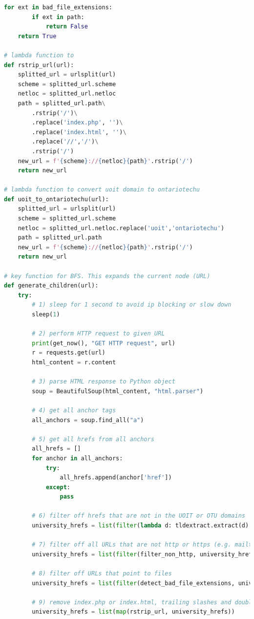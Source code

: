\begin{lstlisting}[language=Python]
    for ext in bad_file_extensions:
        if ext in path:
            return False
    return True

# lambda function to 
def rstrip_url(url):
    splitted_url = urlsplit(url)
    scheme = splitted_url.scheme
    netloc = splitted_url.netloc
    path = splitted_url.path\
        .rstrip('/')\
        .replace('index.php', '')\
        .replace('index.html', '')\
        .replace('//','/')\
        .rstrip('/')
    new_url = f'{scheme}://{netloc}{path}'.rstrip('/')
    return new_url

# lambda function to convert uoit domain to ontariotechu
def uoit_to_ontariotechu(url):
    splitted_url = urlsplit(url)
    scheme = splitted_url.scheme
    netloc = splitted_url.netloc.replace('uoit','ontariotechu')
    path = splitted_url.path
    new_url = f'{scheme}://{netloc}{path}'.rstrip('/')
    return new_url

# key function for BFS. This expands the current node (URL)
def generate_children(url):
    try:
        # 1) sleep for 1 second to avoid ip blocking or slow down
        sleep(1)
        
        # 2) perform HTTP request to given URL
        print(get_now(), "GET HTTP request", url)
        r = requests.get(url)
        html_content = r.content

        # 3) parse HTML response to Python object
        soup = BeautifulSoup(html_content, "html.parser")

        # 4) get all anchor tags
        all_anchors = soup.find_all("a")
        
        # 5) get all hrefs from all anchors
        all_hrefs = []
        for anchor in all_anchors:
            try:
                all_hrefs.append(anchor['href'])
            except:
                pass

        # 6) filter off hrefs that are not in the UOIT or OTU domains
        university_hrefs = list(filter(lambda d: tldextract.extract(d).domain in university_domains, all_hrefs))

        # 7) filter off all URLs that are not http or https (e.g. mailto)
        university_hrefs = list(filter(filter_non_http, university_hrefs))

        # 8) filter off URLs that point to files
        university_hrefs = list(filter(detect_bad_file_extensions, university_hrefs))

        # 9) remove index.php or index.html, trailing slashes and double slashes
        university_hrefs = list(map(rstrip_url, university_hrefs))


\end{lstlisting}
